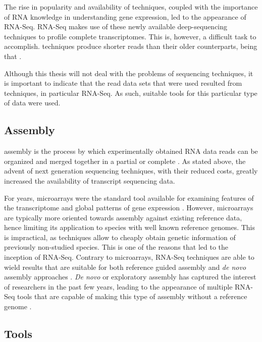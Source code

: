 The rise in popularity and availability of \ngs{} techniques, coupled with the
importance of RNA knowledge in understanding gene expression, led to the
appearance of RNA-Seq. RNA-Seq makes use of these newly available
deep-sequencing techniques to profile complete transcriptomes. This is, however,
a difficult task to accomplish. \ngs{} techniques produce shorter reads than
their older counterparts, being that 
\cite[p. 671]{Martin2011}.

Although this thesis will not deal with the problems of sequencing techniques, it
is important to indicate that the read data sets that were used resulted from
\ngs{} techniques, in particular RNA-Seq. As such, suitable tools for this
particular type of data were used.

\subsection{\Trans{} Assembly}

\Trans{} assembly is the process by which experimentally obtained RNA data reads
can be organized and merged together in a partial or complete \trans. As stated
above, the advent of next generation sequencing techniques, with their reduced
costs, greatly increased the availability of transcript sequencing data.

For years, microarrays were the standard tool available for examining features
of the transcriptome and global patterns of gene expression \cite{Wolf2013}.
However, microarrays are typically more oriented towards assembly against
existing reference data, hence limiting its application to species with well
known reference genomes. This is impractical, as \ngs{} techniques allow to
cheaply obtain genetic information of previously non-studied species. This is
one of the reasons that led to the inception of RNA-Seq. Contrary to
microarrays, RNA-Seq techniques are able to wield results that are suitable for
both reference guided assembly and \textit{de novo} assembly approaches
\cite{Wilhelm2009}. \textit{De novo} or exploratory assembly has captured the
interest of researchers in the past few years, leading to the appearance of
multiple RNA-Seq tools that are capable of making this type of assembly without
a reference genome \cite{nuno11:assemblathon}.

\subsection{\rnaseq{} Tools}\label{sec:seqtools}

